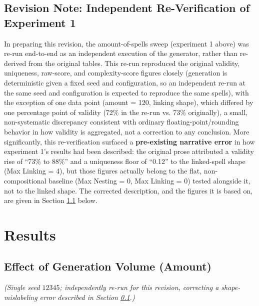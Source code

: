 \documentclass[]{article}
\begin{document}
        \subsection{Revision Note: Independent Re-Verification of Experiment 1}\label{revision-note}

        In preparing this revision, the amount-of-spells sweep (experiment 1 above) was re-run end-to-end as an independent execution of the generator, rather than re-derived from the original tables. This re-run reproduced the original validity, uniqueness, raw-score, and complexity-score figures closely (generation is deterministic given a fixed seed and configuration, so an independent re-run at the same seed and configuration is expected to reproduce the same spells), with the exception of one data point (amount = 120, linking shape), which differed by one percentage point of validity (72\% in the re-run vs. 73\% originally), a small, non-systematic discrepancy consistent with ordinary floating-point/rounding behavior in how validity is aggregated, not a correction to any conclusion. More significantly, this re-verification surfaced a \textbf{pre-existing narrative error} in how experiment 1's results had been described: the original prose attributed a validity rise of ``73\% to 88\%'' and a uniqueness floor of ``0.12'' to the linked-spell shape (Max Linking = 4), but those figures actually belong to the flat, non-compositional baseline (Max Nesting = 0, Max Linking = 0) tested alongside it, not to the linked shape. The corrected description, and the figures it is based on, are given in Section \ref{results-amount} below.

        \section{Results}\label{results}

        \subsection{Effect of Generation Volume (Amount)}\label{results-amount}

        \textit{(Single seed $12345$; independently re-run for this revision, correcting a shape-mislabeling error described in Section \ref{revision-note}.)}
\end{document}
